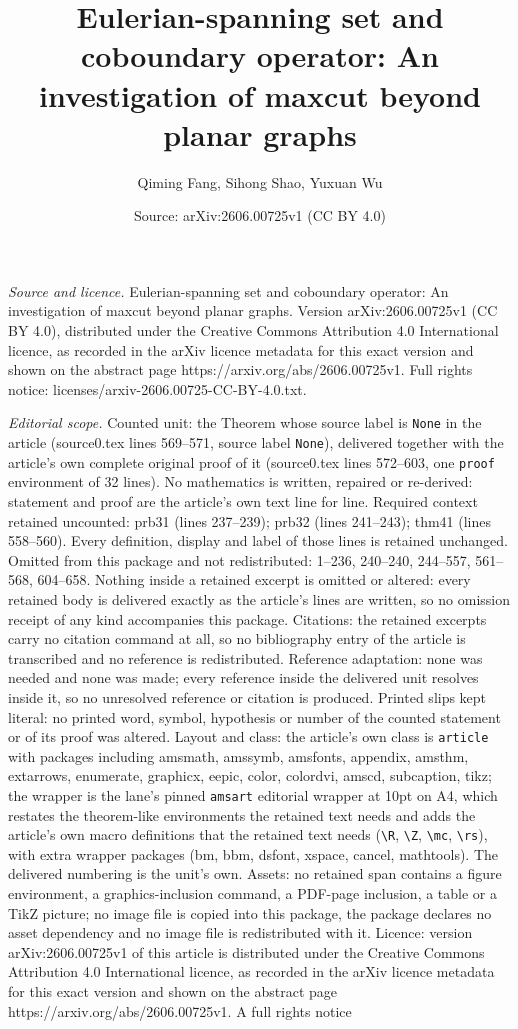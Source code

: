 \documentclass[10pt,a4paper]{amsart}
\title[Eulerian-spanning set and coboundary operator: An investigat]{Eulerian-spanning set and coboundary operator: An investigation of maxcut beyond planar graphs}
\author{Qiming Fang, Sihong Shao, Yuxuan Wu}
\date{Source: arXiv:2606.00725v1 (CC BY 4.0)}
\begin{document}
\maketitle

\noindent\emph{Source and licence.} Eulerian-spanning set and coboundary operator: An investigation of maxcut beyond planar graphs. Version arXiv:2606.00725v1 (CC BY 4.0), distributed under the Creative Commons Attribution 4.0 International licence, as recorded in the arXiv licence metadata for this exact version and shown on the abstract page https://arxiv.org/abs/2606.00725v1. Full rights notice: licenses/arxiv-2606.00725-CC-BY-4.0.txt.\par\smallskip

\noindent\textit{Editorial scope.} Counted unit: the Theorem whose source label is \texttt{None} in the article (source0.tex lines 569--571, source label \texttt{None}), delivered together with the article's own complete original proof of it (source0.tex lines 572--603, one \texttt{proof} environment of 32 lines). No mathematics is written, repaired or re-derived: statement and proof are the article's own text line for line. Required context retained uncounted: prb31 (lines 237--239); prb32 (lines 241--243); thm41 (lines 558--560). Every definition, display and label of those lines is retained unchanged. Omitted from this package and not redistributed: 1--236, 240--240, 244--557, 561--568, 604--658. Nothing inside a retained excerpt is omitted or altered: every retained body is delivered exactly as the article's lines are written, so no omission receipt of any kind accompanies this package. Citations: the retained excerpts carry no citation command at all, so no bibliography entry of the article is transcribed and no reference is redistributed. Reference adaptation: none was needed and none was made; every reference inside the delivered unit resolves inside it, so no unresolved reference or citation is produced. Printed slips kept literal: no printed word, symbol, hypothesis or number of the counted statement or of its proof was altered. Layout and class: the article's own class is \texttt{article} with packages including amsmath, amssymb, amsfonts, appendix, amsthm, extarrows, enumerate, graphicx, eepic, color, colordvi, amscd, subcaption, tikz; the wrapper is the lane's pinned \texttt{amsart} editorial wrapper at 10pt on A4, which restates the theorem-like environments the retained text needs and adds the article's own macro definitions that the retained text needs (\texttt{\textbackslash R}, \texttt{\textbackslash Z}, \texttt{\textbackslash mc}, \texttt{\textbackslash rs}), with extra wrapper packages (bm, bbm, dsfont, xspace, cancel, mathtools). The delivered numbering is the unit's own. Assets: no retained span contains a figure environment, a graphics-inclusion command, a PDF-page inclusion, a table or a TikZ picture; no image file is copied into this package, the package declares no asset dependency and no image file is redistributed with it. Licence: version arXiv:2606.00725v1 of this article is distributed under the Creative Commons Attribution 4.0 International licence, as recorded in the arXiv licence metadata for this exact version and shown on the abstract page https://arxiv.org/abs/2606.00725v1. A full rights notice 
\end{document}
